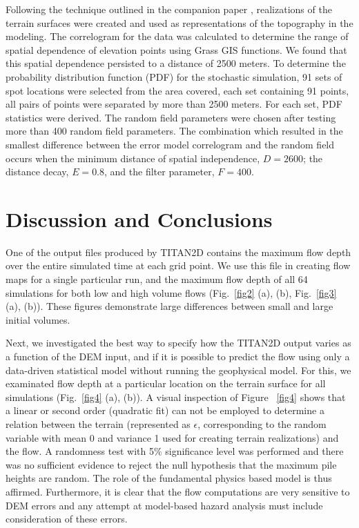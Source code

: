 \documentclass[a4paper,fleqn]{article}
\begin{document}
Following the technique
outlined in the companion paper \citep{stefanescu2}, realizations of
the terrain surfaces were created and used as representations of the
topography in the modeling. The correlogram for the data was calculated to determine the range of spatial dependence of elevation points
 using Grass GIS functions. We found that this spatial dependence persisted to a distance of 2500 meters. To determine the probability distribution function (PDF)
 for the stochastic simulation, 91 sets of spot locations were selected from the area covered, each set containing 91 points, all pairs of points were separated 
 by more than 2500 meters. For each set, PDF statistics were derived.
The random field parameters were chosen
after testing more than 400 random field parameters. The combination
which resulted in the smallest difference between the error model
correlogram and the random field occurs when the minimum distance of
spatial independence, $D =2600$; the distance decay, $E = 0.8$, and
the filter parameter, $F =400$.  

\section{Discussion and Conclusions}

One of the output files produced by TITAN2D contains the maximum flow
depth over the entire simulated time at each grid point.  We use this
file in creating flow maps for a single particular run, and the maximum
flow depth of all 64 simulations for both low and high volume flows
(Fig.~\ref{fig2} (a), (b), Fig.~\ref{fig3} (a), (b)). These figures demonstrate large differences between small and large initial volumes.


  Next, we
investigated the best way to specify how the TITAN2D output
varies as a function of the DEM input, and if it is possible to
predict the flow using only a data-driven statistical model
without running the geophysical model. For this, we
examinated flow depth at a particular location on the terrain
surface for all simulations (Fig.~\ref{fig4} (a), (b)).  A visual
inspection of Figure ~\ref{fig4} shows that a linear or second order (quadratic fit) can not be employed to
determine a relation between the terrain (represented as $\epsilon$, corresponding to the random variable with
mean 0 and variance 1 used for creating terrain realizations) and the
flow. A randomness test with 5$\%$
significance level was performed and there was no sufficient evidence to reject the
null hypothesis that the maximum pile heights are random. 
The role of the fundamental physics based model is thus affirmed.
Furthermore, it is clear that the flow computations are very sensitive to
DEM errors and any attempt at model-based hazard analysis must include 
consideration of these errors.
\end{document}
